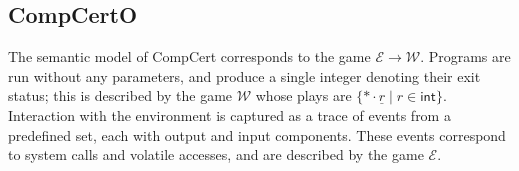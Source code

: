 \documentclass[sigplan,10pt,review,anonymous]{acmart}\settopmatter{printfolios=true,printccs=false,printacmref=false}
\newcommand{\kw}[1]{\ensuremath{ \mathsf{#1} }}
\begin{document}
%
%
%
%
%

\subsection{CompCertO} \label{sec:mainideas:compcerto} %

The semantic model of CompCert corresponds to
the game $\mathcal{E} \rightarrow \mathcal{W}$.
Programs are run without any parameters,
and produce a single integer denoting their exit status;
this is described by the game $\mathcal{W}$
whose plays are $\{ * \cdot \underline{r} \mid r \in \kw{int} \}$.
Interaction with the environment
is captured as a trace of events from a predefined set,
each with output and input components.
These events correspond to system calls and volatile accesses,
and are described by the game $\mathcal{E}$.
\end{document}
